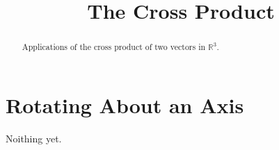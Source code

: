 \documentclass{ximera}
\title{The Cross Product}
\begin{document}
\begin{abstract}
Applications of the cross product of two vectors in $\mathbb{R}^3$.
\end{abstract}
\maketitle

\section{Rotating About an Axis}

Noithing yet.
\end{document}
